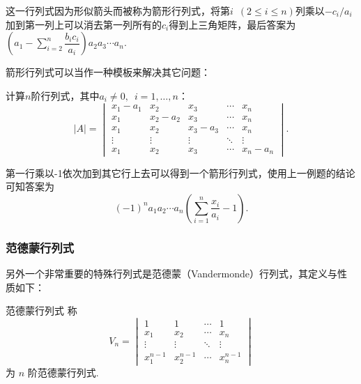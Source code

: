 \begin{solution}
    这一行列式因为形似箭头而被称为箭形行列式，将第$i\enspace(2\leqslant i\leqslant n)$列乘以$-c_i/a_i$加到第一列上可以消去第一列所有的$c_i$得到上三角矩阵，最后答案为$(a_1-\sum\limits_{i=2}^n\dfrac{b_ic_i}{a_i})a_2a_3\cdots a_n$.
\end{solution}

箭形行列式可以当作一种模板来解决其它问题：

\begin{example}{}{}
    计算$n$阶行列式，其中$a_i\neq 0,\enspace i=1,\ldots,n$：
    \[|A|=\begin{vmatrix}
            x_1-a_1 & x_2     & x_3     & \cdots & x_n     \\
            x_1     & x_2-a_2 & x_3     & \cdots & x_n     \\
            x_1     & x_2     & x_3-a_3 & \cdots & x_n     \\
            \vdots  & \vdots  & \vdots  & \ddots & \vdots  \\
            x_1     & x_2     & x_3     & \cdots & x_n-a_n
        \end{vmatrix}.\]
\end{example}

\begin{solution}
    第一行乘以-1依次加到其它行上去可以得到一个箭形行列式，使用上一例题的结论可知答案为\[(-1)^na_1a_2\cdots a_n(\sum\limits_{i=1}^n\dfrac{x_i}{a_i}-1).\]
\end{solution}

\subsubsection{范德蒙行列式}

另外一个非常重要的特殊行列式是范德蒙（Vandermonde）行列式，其定义与性质如下：

\begin{definition}{范德蒙行列式}{}
    称
    \[V_n=\begin{vmatrix}
            1         & 1         & \cdots & 1         \\
            x_1       & x_2       & \cdots & x_n       \\
            \vdots    & \vdots    & \ddots & \vdots    \\
            x_1^{n-1} & x_2^{n-1} & \cdots & x_n^{n-1}
        \end{vmatrix}\]
    为 $n$ 阶范德蒙行列式.
\end{definition}


